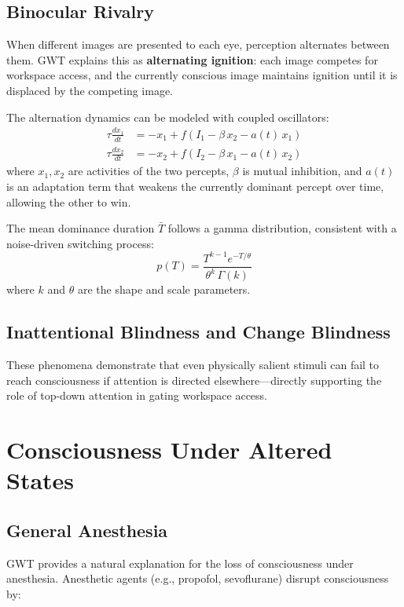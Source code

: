 \documentclass[11pt,a4paper]{report}
\begin{document}
\section{Binocular Rivalry}

When different images are presented to each eye, perception alternates between them. GWT explains this as \textbf{alternating ignition}: each image competes for workspace access, and the currently conscious image maintains ignition until it is displaced by the competing image.

The alternation dynamics can be modeled with coupled oscillators:
\begin{align}
  \tau \frac{dx_1}{dt} &= -x_1 + f(I_1 - \beta\, x_2 - a(t)\, x_1) \\
  \tau \frac{dx_2}{dt} &= -x_2 + f(I_2 - \beta\, x_1 - a(t)\, x_2)
\end{align}
where $x_1, x_2$ are activities of the two percepts, $\beta$ is mutual inhibition, and $a(t)$ is an adaptation term that weakens the currently dominant percept over time, allowing the other to win.

The mean dominance duration $\bar{T}$ follows a gamma distribution, consistent with a noise-driven switching process:
\[
  p(T) = \frac{T^{k-1} e^{-T/\theta}}{\theta^k \,\Gamma(k)}
\]
where $k$ and $\theta$ are the shape and scale parameters.

\section{Inattentional Blindness and Change Blindness}

These phenomena demonstrate that even physically salient stimuli can fail to reach consciousness if attention is directed elsewhere---directly supporting the role of top-down attention in gating workspace access.


\chapter{Consciousness Under Altered States}

\section{General Anesthesia}

GWT provides a natural explanation for the loss of consciousness under anesthesia. Anesthetic agents (e.g., propofol, sevoflurane) disrupt consciousness by:
\end{document}
